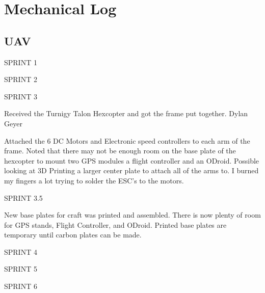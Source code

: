 \section{Mechanical Log}


\subsection{UAV}
\begin{description}

\item SPRINT 1

\item SPRINT 2

\item SPRINT 3

\item [11/9/15]  Received the Turnigy Talon Hexcopter and got the frame put together. \hfill{Dylan Geyer}

\item [11/11/15] Attached the 6 DC Motors and Electronic speed controllers to each arm of the frame. Noted that there may not be enough room on the base plate of the hexcopter to mount two GPS modules a flight controller and an ODroid. Possible looking at 3D Printing a larger center plate to attach all of the arms to. I burned my fingers a lot trying to solder the ESC's to the motors.

\item SPRINT 3.5

\item [12/28/15]  New base plates for craft was printed and assembled. There is now plenty of room for GPS stands, Flight Controller, and ODroid. Printed base plates are temporary until carbon plates can be made.  

\item SPRINT 4

\item SPRINT 5

\item SPRINT 6
\end{description}